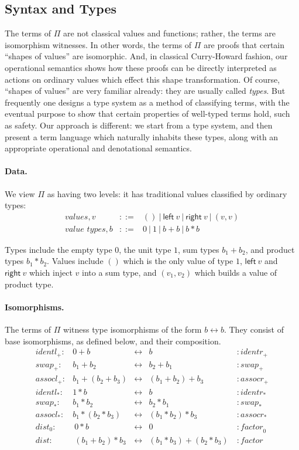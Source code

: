 \documentclass[11pt]{article}
\newcommand{\alt}{~|~}
\newcommand{\leftv}[1]{\textsf{left}~#1}
\newcommand{\rightv}[1]{\textsf{right}~#1}
\newcommand{\iso}{\leftrightarrow}
\newcommand{\identlp}{\mathit{identl}_+}
\newcommand{\identrp}{\mathit{identr}_+}
\newcommand{\swapp}{\mathit{swap}_+}
\newcommand{\assoclp}{\mathit{assocl}_+}
\newcommand{\assocrp}{\mathit{assocr}_+}
\newcommand{\identlt}{\mathit{identl}_*}
\newcommand{\identrt}{\mathit{identr}_*}
\newcommand{\swapt}{\mathit{swap}_*}
\newcommand{\assoclt}{\mathit{assocl}_*}
\newcommand{\assocrt}{\mathit{assocr}_*}
\newcommand{\distz}{\mathit{dist}_0}
\newcommand{\factorz}{\mathit{factor}_0}
\newcommand{\dist}{\mathit{dist}}
\newcommand{\factor}{\mathit{factor}}
\begin{document}
\subsection{Syntax and Types} 

The terms of $\Pi$ are not classical values and functions; rather, the terms
are isomorphism witnesses.  In other words, the terms of $\Pi$ are proofs
that certain ``shapes of values'' are isomorphic.  And, in classical
Curry-Howard fashion, our operational semantics shows how these proofs can be
directly interpreted as actions on ordinary values which effect this shape
transformation. Of course, ``shapes of values'' are very familiar already:
they are usually called \emph{types}.  But frequently one designs a type
system as a method of classifying terms, with the eventual purpose to show
that certain properties of well-typed terms hold, such as safety.  Our
approach is different: we start from a type system, and then present a term
language which naturally inhabits these types, along with an appropriate
operational and denotational semantics.

\paragraph*{Data.}
We view $\Pi$ as having two levels: it has traditional values classified by
ordinary types:
\[\begin{array}{lrcl} 
\textit{values}, v &::=& () \alt \leftv{v} \alt \rightv{v} \alt (v,v) \\
\textit{value types}, b &::=& 0 \alt 1 \alt b+b \alt b * b
\end{array}\]

Types include the empty type $0$, the unit type $1$, sum types $b_1+b_2$, and
product types $b_1*b_2$.  Values include $()$ which is the only value of type
$1$, $\leftv{v}$ and $\rightv{v}$ which inject $v$ into a sum type, and
$(v_1,v_2)$ which builds a value of product type.

\paragraph*{Isomorphisms.} The terms of $\Pi$ witness
type isomorphisms of the form $b \iso b$. They consist of base isomorphisms,
as defined below, and their composition.
\[\begin{array}{rrcll}
\identlp :&  0 + b & \iso & b &: \identrp \\
\swapp :&  b_1 + b_2 & \iso & b_2 + b_1 &: \swapp \\
\assoclp :&  b_1 + (b_2 + b_3) & \iso & (b_1 + b_2) + b_3 &: \assocrp \\
\identlt :&  1 * b & \iso & b &: \identrt \\
\swapt :&  b_1 * b_2 & \iso & b_2 * b_1 &: \swapt \\
\assoclt :&  b_1 * (b_2 * b_3) & \iso & (b_1 * b_2) * b_3 &: \assocrt \\
\distz :&~ 0 * b & \iso & 0 &: \factorz \\
\dist :&~ (b_1 + b_2) * b_3 & \iso & (b_1 * b_3) + (b_2 * b_3)~ &: \factor
\end{array}\]
\end{document}
